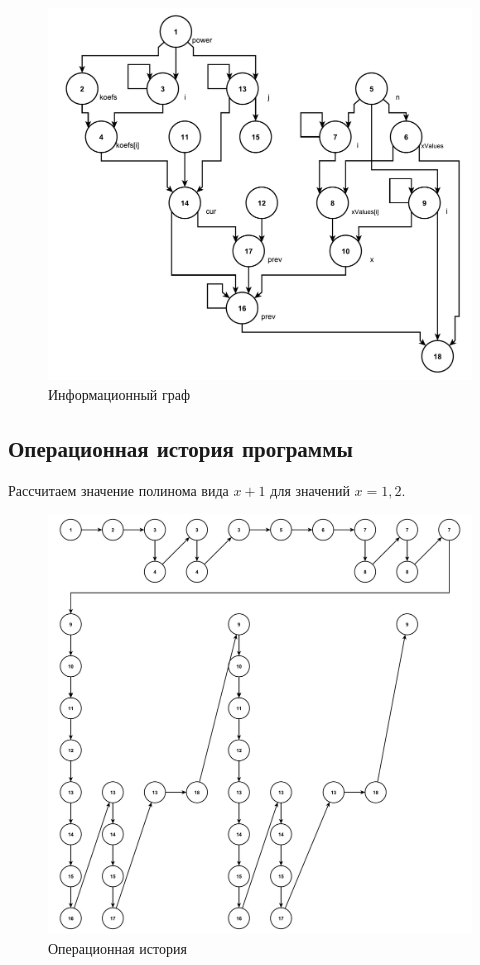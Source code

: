 \begin{figure}[h]
	\centering
	\includegraphics[height=0.5\textheight]{img/информационный_граф.pdf}
	\caption{Информационный граф}
	\label{fg:ig}
\end{figure}

\clearpage

\subsection{Операционная история программы}

Рассчитаем значение полинома вида $x + 1$ для значений $x = {1, 2}$.

\begin{figure}[h]
	\centering
	\includegraphics[height=0.6\textheight]{img/операционная_история.pdf}
	\caption{Операционная история}
	\label{fg:oi}
\end{figure}

